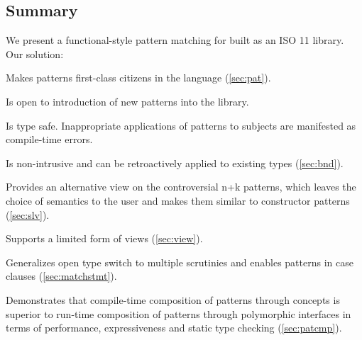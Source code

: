 
\subsection{Summary}

We present a functional-style pattern matching for \Cpp{} built as an ISO 
\Cpp{}11 library. Our solution:

\begin{compactitem}
\setlength{\itemsep}{0pt}
\setlength{\parskip}{0pt}
  \item Makes patterns first-class citizens in the language (\textsection\ref{sec:pat}).
  \item Is open to introduction of new patterns into the library.
  \item Is type safe. Inappropriate applications of patterns to subjects are manifested as compile-time errors.  
  \item Is non-intrusive and can be retroactively applied to existing types (\textsection\ref{sec:bnd}).
  \item Provides an alternative view on the controversial n+k patterns, which 
        leaves the choice of semantics to the user and makes them similar to 
        constructor patterns (\textsection\ref{sec:slv}).
  \item Supports a limited form of views (\textsection\ref{sec:view}).
  \item Generalizes open type switch to multiple scrutinies and enables patterns 
        in case clauses (\textsection\ref{sec:matchstmt}).
  \item Demonstrates that compile-time composition of patterns through 
        concepts is superior to run-time composition of patterns through 
        polymorphic interfaces in terms of performance, expressiveness and 
        static type checking (\textsection\ref{sec:patcmp}).
\end{compactitem}

